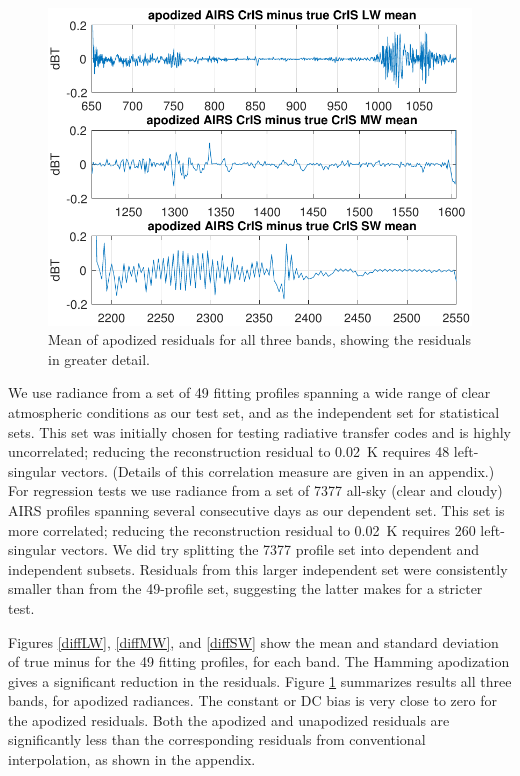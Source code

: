 \documentclass[journal]{IEEEtran}
\begin{document}
\begin{figure} %
  \centering
  \includegraphics[width=\linewidth]{figures/a2cris_diff_all.pdf}
  \caption{Mean of apodized residuals for all three {\cris} bands,
    showing the residuals in greater detail.}
  \label{meanAll}
\end{figure}

We use radiance from a set of 49 fitting profiles spanning a wide
range of clear atmospheric conditions as our test set, and as the
independent set for statistical sets.  This set was initially chosen
for testing radiative transfer codes \cite{sarta1,sarta2} and is
highly uncorrelated; reducing the reconstruction residual to 0.02~K
requires 48 left-singular vectors.  (Details of this correlation
measure are given in an appendix.)  For regression tests we use
radiance from a set of 7377 all-sky (clear and cloudy) AIRS profiles
spanning several consecutive days as our dependent set.  This set is
more correlated; reducing the reconstruction residual to 0.02~K
requires 260 left-singular vectors.  We did try splitting the 7377
profile set into dependent and independent subsets.  Residuals from
this larger independent set were consistently smaller than from the
49-profile set, suggesting the latter makes for a stricter test.

Figures \ref{diffLW}, \ref{diffMW}, and \ref{diffSW} show the mean
and standard deviation of true {\cris} minus {\airs} {\cris} for the
49 fitting profiles, for each {\cris} band.  The Hamming apodization
gives a significant reduction in the residuals.  Figure
\ref{meanAll} summarizes results all three bands, for apodized
radiances.  The constant or DC bias is very close to zero for the
apodized residuals.  Both the apodized and unapodized residuals are
significantly less than the corresponding residuals from
conventional interpolation, as shown in the appendix.
\end{document}
